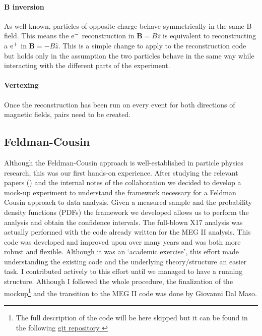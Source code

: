 \begin{refsection}
        \paragraph{\textbf{B} inversion}
        As well known, particles of opposite charge behave symmetrically in the same B field.
        This means the $\text{e}^-$ reconstruction in $\textbf{B}=B\hat{z}$ is equivalent to reconstructing a $\text{e}^+$ in $\textbf{B}=-B\hat{z}$.
        This is a simple change to apply to the reconstruction code but holds only in the assumption the two particles behave in the same way while interacting with the different parts of the experiment.
        
        \paragraph{Vertexing}
        Once the reconstruction has been run on every event for both directions of magnetic fields, pairs need to be created.

    \subsection{Feldman-Cousin}
        Although the Feldman-Cousin approach is well-established in particle physics research, this was our first hands-on experience. 
        After studying the relevant papers (\cite{feldman:1998}\cite{feldman:2011}) and the internal notes of the collaboration we decided to develop a mock-up experiment to understand the framework necessary for a Feldman Cousin approach to data analysis.  
        Given a measured sample and the probability density functions (PDFs) the framework we developed allows us to perform the analysis and obtain the confidence intervals.
        The full-blown X17 analysis was actually performed with the code already written for the MEG II analysis. This code was developed and improved upon over many years and was both more robust and flexible. 
        Although it was an `academic exercise', this effort made understanding the existing code and the underlying theory/structure an easier task.  
        I contributed actively to this effort until we managed to have a running structure.
        Although I followed the whole procedure, the finalization of the mockup\footnote{ The full description of the code will be here skipped but it can be found in the following 
        \href{https://github.com/gdalmaso96/X17_LL_mock_up}{\underline{git repository \faGithubSquare}}} and the transition to the MEG II code was done by Giovanni Dal Maso.


\end{refsection}
